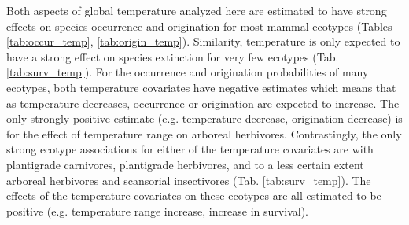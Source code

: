 \documentclass[12pt,letterpaper]{article}
\begin{document}
Both aspects of global temperature analyzed here are estimated to have strong effects on species occurrence and origination for most mammal ecotypes (Tables \ref{tab:occur_temp}, \ref{tab:origin_temp}). Similarity, temperature is only expected to have a strong effect on species extinction for very few ecotypes (Tab. \ref{tab:surv_temp}). For the occurrence and origination probabilities of many ecotypes, both temperature covariates have negative estimates which means that as temperature decreases, occurrence or origination are expected to increase. The only strongly positive estimate (e.g. temperature decrease, origination decrease) is for the effect of temperature range on arboreal herbivores. Contrastingly, the only strong ecotype associations for either of the temperature covariates are with plantigrade carnivores, plantigrade herbivores, and to a less certain extent arboreal herbivores and scansorial insectivores (Tab. \ref{tab:surv_temp}). The effects of the temperature covariates on these ecotypes are all estimated to be positive (e.g. temperature range increase, increase in survival).
\end{document}
